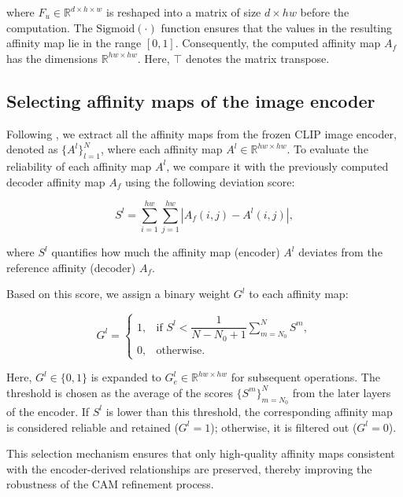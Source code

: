 where $F_u \in \mathbb{R}^{d \times h \times w}$ is reshaped into a matrix of size $d \times hw$ before the computation. The $\text{Sigmoid}(\cdot)$ function ensures that the values in the resulting affinity map lie in the range $[0, 1]$. Consequently, the computed affinity map $A_f$ has the dimensions $\mathbb{R}^{hw \times hw}$. Here, $\top$ denotes the matrix transpose.

\subsection{Selecting affinity maps of the image encoder}
\label{subsec:att_map_encoder}
Following \cite{wsss_frozen_clip}, we extract all the affinity maps from the frozen CLIP image encoder, denoted as $\{A^l\}_{l=1}^N$, where each affinity map $A^l \in \mathbb{R}^{hw \times hw}$. To evaluate the reliability of each affinity map $A^l$, we compare it with the previously computed decoder affinity map $A_f$ using the following deviation score:

\begin{equation}
    S^l = \sum_{i=1}^{hw} \sum_{j=1}^{hw} \left| A_f(i, j) - A^l(i, j) \right|,
\end{equation}

where $S^l$ quantifies how much the affinity map (encoder) $A^l$ deviates from the reference affinity (decoder) $A_f$.  

Based on this score, we assign a binary weight $G^l$ to each affinity map:  

\begin{equation}
    G^l =
    \begin{cases}
        1, & \text{if } S^l < \dfrac{1}{N - N_0 + 1} \sum_{m=N_0}^N S^m, \\[8pt]
        0, & \text{otherwise}.
    \end{cases}
\end{equation}

Here, $G^l \in \{0,1\}$ is expanded to $G^l_e \in \mathbb{R}^{hw \times hw}$ for subsequent operations. The threshold is chosen as the average of the scores $\{S^m\}_{m=N_0}^N$ from the later layers of the encoder. If $S^l$ is lower than this threshold, the corresponding affinity map is considered reliable and retained ($G^l = 1$); otherwise, it is filtered out ($G^l = 0$).  

This selection mechanism ensures that only high-quality affinity maps consistent with the encoder-derived relationships are preserved, thereby improving the robustness of the CAM refinement process.  

